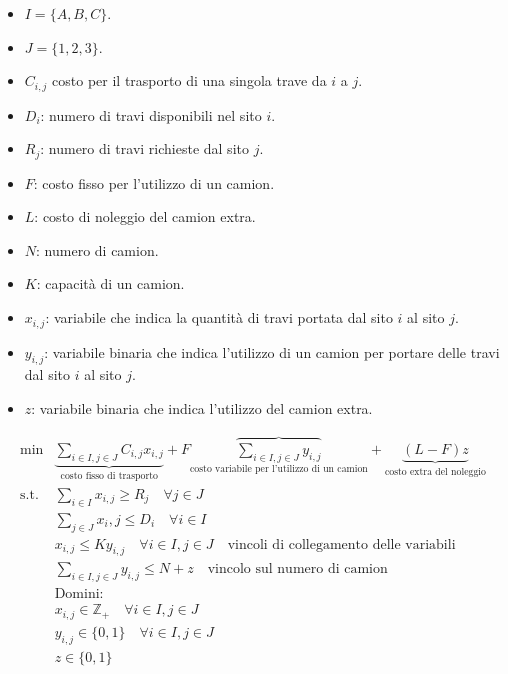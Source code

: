 \begin{itemize}
	\item $I = \{A, B, C\}$.
	\item $J = \{1,2,3\}$.
	\item $C_{i,j}$ costo per il trasporto di una singola trave da $i$ a $j$.
	\item $D_i$: numero di travi disponibili nel sito $i$.
	\item $R_j$: numero di travi richieste dal sito $j$.
	\item $F$: costo fisso per l'utilizzo di un camion.
	\item $L$: costo di noleggio del camion extra.
	\item $N$: numero di camion.
	\item $K$: capacità di un camion.
	\item $x_{i,j}$: variabile che indica la quantità di travi portata dal sito $i$ al sito $j$.
	\item $y_{i,j}$: variabile binaria che indica l'utilizzo di un camion per portare delle travi dal sito $i$ al sito $j$.
	\item $z$: variabile binaria che indica l'utilizzo del camion extra.
\end{itemize}

\begin{align*}
\min &\underbrace{\sum\limits_{i \in I, j \in J} C_{i,j} x_{i,j}}_{\text{costo fisso di trasporto}}+ F \overbrace{
\sum\limits_{i \in I, j \in J} y_{i,j}}_{\text{costo variabile per l'utilizzo di un camion}} + \underbrace{(L-F)z}_{\text{costo extra del noleggio}} \\
\text{s.t. }&\sum\limits_{i \in I} x_{i,j} \geq R_j \quad\forall j \in J\\
&\sum\limits_{j \in J} x_i,j \leq D_i \quad\forall i \in I \\
&x_{i,j} \leq K y_{i,j} \quad\forall i \in I, j \in J \quad\text{vincoli di collegamento delle variabili}\\
&\sum\limits_{i \in I, j \in J} y_{i,j} \leq N + z \quad\text{vincolo sul numero di camion}\\ 
&\text{Domini:} \\
&x_{i,j} \in \mathbb{Z}_+  \quad\forall i \in I, j \in J  \\
&y_{i,j} \in \{0,1\}  \quad\forall i \in I, j \in J  \\
&z \in \{0,1\}
\end{align*}
